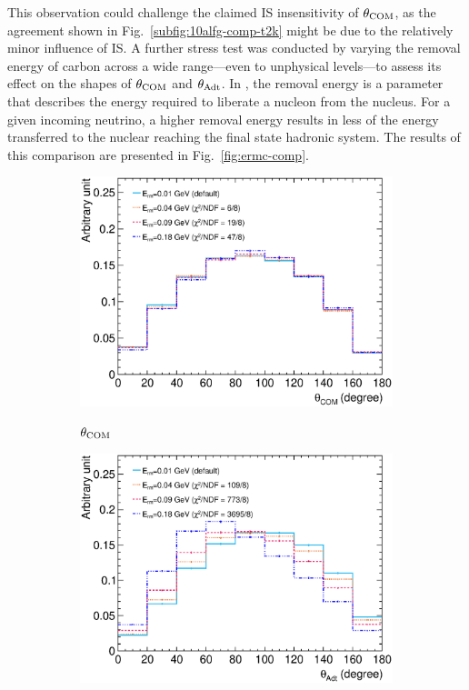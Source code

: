      This observation could challenge the claimed IS insensitivity of $\theta_{\textrm{COM}}$, as the agreement shown in Fig.~\ref{subfig:10alfg-comp-t2k} might be due to the relatively minor influence of IS.
     A further stress test was conducted by varying the removal energy of carbon across a wide range—even to unphysical levels—to assess its effect on the shapes of $\theta_{\textrm{COM}}$ and $\theta_{\textrm{Adt}}$.
     In \genie, the removal energy is a parameter that describes the energy required to liberate a nucleon from the nucleus.
     For a given incoming neutrino, a higher removal energy results in less of the energy transferred to the nuclear reaching the final state hadronic system.
     The results of this comparison are presented in Fig.~\ref{fig:ermc-comp}.
     \begin{figure}[ht!]
     \centering
     \begin{subfigure}[ht!]{\dbfigwid\textwidth}
          \centering
          \includegraphics[width=\textwidth]{figures/COM/anorm-nuc_da_tan.eps}\\
          \caption{$\theta_{\textrm{COM}}$}
          \label{subfig:ermc-comp-com}
     \end{subfigure}
     \begin{subfigure}[ht!]{\dbfigwid\textwidth}
          \centering
          \includegraphics[width=\textwidth]{figures/COM/anorm-nuc_adt.eps}

\end{subfigure}
\end{figure}
